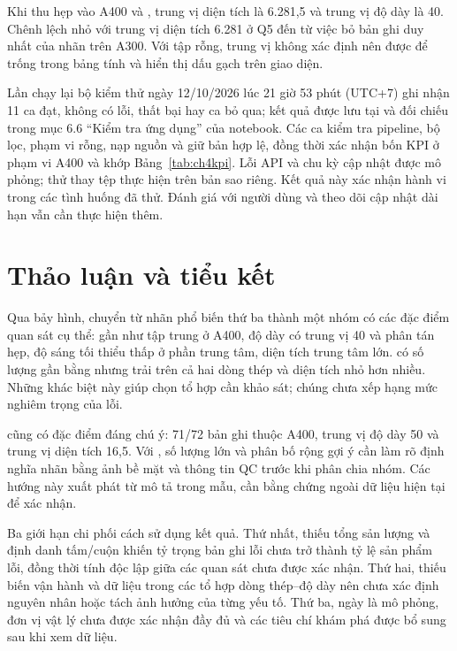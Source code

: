 Khi thu hẹp vào A400 và , trung vị diện tích là 6.281,5 và trung vị độ dày là 40. Chênh lệch nhỏ với trung vị diện tích 6.281 ở Q5 đến từ việc bỏ bản ghi duy nhất của nhãn trên A300. Với tập rỗng, trung vị không xác định nên được để trống trong bảng tính và hiển thị dấu gạch trên giao diện.

Lần chạy lại bộ kiểm thử ngày 12/10/2026 lúc 21 giờ 53 phút (UTC+7) ghi nhận 11 ca đạt, không có lỗi, thất bại hay ca bỏ qua; kết quả được lưu tại  và đối chiếu trong mục 6.6 ``Kiểm tra ứng dụng'' của notebook. Các ca kiểm tra pipeline, bộ lọc, phạm vi rỗng, nạp nguồn và giữ bản hợp lệ, đồng thời xác nhận bốn KPI ở phạm vi A400 và  khớp Bảng~\ref{tab:ch4kpi}. Lỗi API và chu kỳ cập nhật được mô phỏng; thử thay tệp thực hiện trên bản sao riêng. Kết quả này xác nhận hành vi trong các tình huống đã thử. Đánh giá với người dùng và theo dõi cập nhật dài hạn vẫn cần thực hiện thêm.

\section{Thảo luận và tiểu kết}
\label{sec:ch4thaoluan}

Qua bảy hình,  chuyển từ nhãn phổ biến thứ ba thành một nhóm có các đặc điểm quan sát cụ thể: gần như tập trung ở A400, độ dày có trung vị 40 và phân tán hẹp, độ sáng tối thiểu thấp ở phần trung tâm, diện tích trung tâm lớn.  có số lượng gần bằng nhưng trải trên cả hai dòng thép và diện tích nhỏ hơn nhiều. Những khác biệt này giúp chọn tổ hợp cần khảo sát; chúng chưa xếp hạng mức nghiêm trọng của lỗi.

 cũng có đặc điểm đáng chú ý: 71/72 bản ghi thuộc A400, trung vị độ dày 50 và trung vị diện tích 16,5. Với , số lượng lớn và phân bố rộng gợi ý cần làm rõ định nghĩa nhãn bằng ảnh bề mặt và thông tin QC trước khi phân chia nhóm. Các hướng này xuất phát từ mô tả trong mẫu, cần bằng chứng ngoài dữ liệu hiện tại để xác nhận.

Ba giới hạn chi phối cách sử dụng kết quả. Thứ nhất, thiếu tổng sản lượng và định danh tấm/cuộn khiến tỷ trọng bản ghi lỗi chưa trở thành tỷ lệ sản phẩm lỗi, đồng thời tính độc lập giữa các quan sát chưa được xác nhận. Thứ hai, thiếu biến vận hành và dữ liệu trong các tổ hợp dòng thép--độ dày nên chưa xác định nguyên nhân hoặc tách ảnh hưởng của từng yếu tố. Thứ ba, ngày là mô phỏng, đơn vị vật lý chưa được xác nhận đầy đủ và các tiêu chí khám phá được bổ sung sau khi xem dữ liệu.

